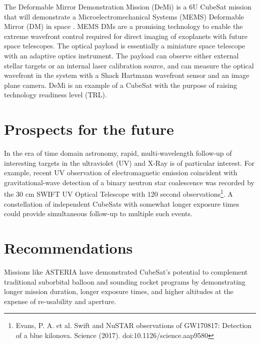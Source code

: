 \documentclass[12pt]{article}
\begin{document}
The Deformable Mirror Demonstration Mission (DeMi) is a 6U CubeSat mission that will demonstrate a Microelectromechanical Systems (MEMS) Deformable Mirror (DM) in space \cite{morgan_mems_2019}. MEMS DMs are a promising technology to enable the extreme wavefront control required for direct imaging of exoplanets with future space telescopes. The optical payload is essentially a miniature space telescope with an adaptive optics instrument. The payload can observe either external stellar targets or an internal laser calibration source, and can measure the optical wavefront in the system with a Shack Hartmann wavefront sensor and an image plane camera. DeMi is an example of a CubeSat with the purpose of raising technology readiness level (TRL).


\section{Prospects for the future}

 In the era of time domain astronomy, rapid, multi-wavelength follow-up of interesting targets in the ultraviolet (UV) and X-Ray is of particular interest.
 For example, recent  UV  observation of electromagnetic emission coincident with gravitational-wave detection of a binary neutron star coalescence was recorded by the 30 cm SWIFT UV Optical Telescope with 120 second observations\footnote{Evans, P. A. et al. Swift and NuSTAR observations of GW170817: Detection of a blue kilonova. Science (2017). doi:10.1126/science.aap9580}.  A constellation of independent CubeSats with somewhat longer exposure times could provide simultaneous  follow-up to multiple such events.
 
 
\section{Recommendations}

Missions like ASTERIA  have demonstrated CubeSat's potential to complement traditional suborbital balloon and sounding rocket programs by demonstrating longer mission duration, longer exposure times, and higher altitudes at the expense of re-usability and aperture.
\end{document}
